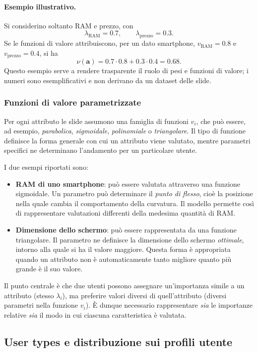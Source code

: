 \paragraph{Esempio illustrativo.} Si considerino soltanto RAM e prezzo, con
\[
\lambda_{\mathrm{RAM}}=0.7,\qquad
\lambda_{\mathrm{prezzo}}=0.3.
\]
Se le funzioni di valore attribuiscono, per un dato smartphone, $v_{\mathrm{RAM}}=0.8$ e $v_{\mathrm{prezzo}}=0.4$, si ha
\[
\nu(\mathbf a)=0.7\cdot0.8+0.3\cdot0.4=0.68.
\]
Questo esempio serve a rendere trasparente il ruolo di pesi e funzioni di valore; i numeri sono esemplificativi e non derivano da un dataset delle slide.

\subsubsection{Funzioni di valore parametrizzate}
Per ogni attributo le slide assumono una famiglia di funzioni $v_i$, che può essere, ad esempio, \emph{parabolica}, \emph{sigmoidale}, \emph{polinomiale} o \emph{triangolare}. Il tipo di funzione definisce la forma generale con cui un attributo viene valutato, mentre parametri specifici ne determinano l'andamento per un particolare utente.

I due esempi riportati sono:
\begin{itemize}
    \item \textbf{RAM di uno smartphone}: può essere valutata attraverso una funzione sigmoidale. Un parametro può determinare il \emph{punto di flesso}, cioè la posizione nella quale cambia il comportamento della curvatura. Il modello permette così di rappresentare valutazioni differenti della medesima quantità di RAM.
    \item \textbf{Dimensione dello schermo}: può essere rappresentata da una funzione triangolare. Il parametro ne definisce la dimensione dello schermo \emph{ottimale}, intorno alla quale si ha il valore maggiore. Questa forma è appropriata quando un attributo non è automaticamente tanto migliore quanto più grande è il suo valore.
\end{itemize}
Il punto centrale è che due utenti possono assegnare un'importanza simile a un attributo (stesso $\lambda_i$), ma preferire valori diversi di quell'attributo (diversi parametri nella funzione $v_i$). È dunque necessario rappresentare \emph{sia} le importanze relative \emph{sia} il modo in cui ciascuna caratteristica è valutata.

\subsection{User types e distribuzione sui profili utente}

